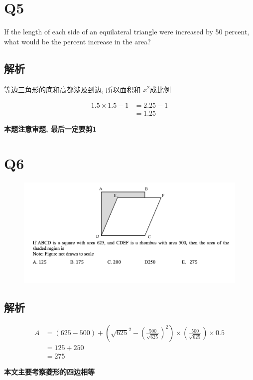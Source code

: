 \section{Q5}

  If the length of each side of an equilateral triangle were increased by
  50 percent, what would be the percent increase in the area?

  \subsection{解析}

    等边三角形的底和高都涉及到边, 所以面积和 $ x^{2} $成比例

    \begin{align*}
      1.5 \times 1.5 - 1 &= 2.25 - 1 \\
      &= 1.25
    \end{align*}

    \textbf{本题注意审题, 最后一定要剪1}

\section{Q6}

  \begin{figure}[H]
    \centering
    \includegraphics[width=0.7\columnwidth]{images/areas/geometry/q6}
  \end{figure}

  \subsection{解析}

    \begin{align*}
      A &=
      \left( 625 - 500 \right)
      + \left( \sqrt{625}^{2}
        - \left( \frac{500}{\sqrt{625}} \right)^{2}
        \right)
      \times \left( \frac{500}{\sqrt{625}} \right)
      \times 0.5 \\
      &= 125 + 250 \\
      &= 275
    \end{align*}

    \textbf{本文主要考察菱形的四边相等}
